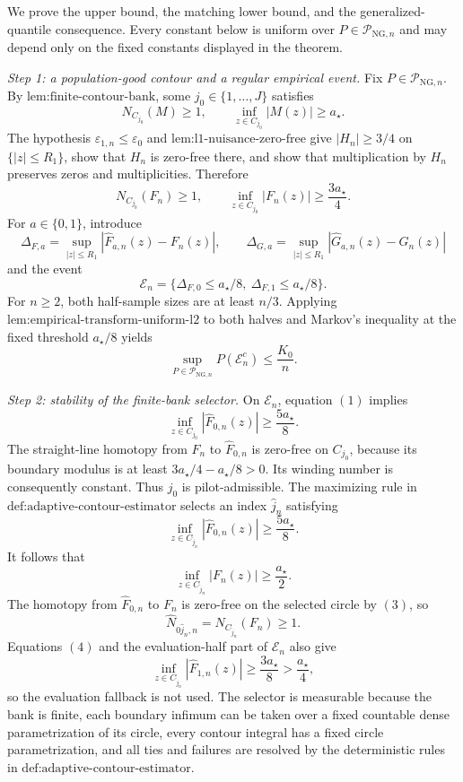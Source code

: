 We prove the upper bound, the matching lower bound, and the generalized-quantile consequence.  Every constant below is uniform over \(P\in\mathcal P_{\mathrm{NG},n}\) and may depend only on the fixed constants displayed in the theorem.

\emph{Step 1: a population-good contour and a regular empirical event.}
Fix \(P\in\mathcal P_{\mathrm{NG},n}\).  By \(\text{lem:finite-contour-bank}\), some \(j_0\in\{1,\ldots,J\}\) satisfies
\[
 N_{C_{j_0}}(M)\ge1,
 \qquad
 \inf_{z\in C_{j_0}}|M(z)|\ge a_{\star}.
\]
The hypothesis \(\varepsilon_{1,n}\le\varepsilon_0\) and \(\text{lem:l1-nuisance-zero-free}\) give \(|H_n|\ge3/4\) on \(\{|z|\le R_1\}\), show that \(H_n\) is zero-free there, and show that multiplication by \(H_n\) preserves zeros and multiplicities.  Therefore
\[
 N_{C_{j_0}}(F_n)\ge1,
 \qquad
 \inf_{z\in C_{j_0}}|F_n(z)|\ge\frac{3a_{\star}}4. \tag{1}
\]
For \(a\in\{0,1\}\), introduce
\[
 \Delta_{F,a}=\sup_{|z|\le R_1}
 |\widehat F_{a,n}(z)-F_n(z)|,
 \qquad
 \Delta_{G,a}=\sup_{|z|\le R_1}
 |\widehat G_{a,n}(z)-G_n(z)|
\]
and the event
\[
 \mathcal E_n=
 \{\Delta_{F,0}\le a_{\star}/8,\ 
   \Delta_{F,1}\le a_{\star}/8\}.
\]
For \(n\ge2\), both half-sample sizes are at least \(n/3\).  Applying \(\text{lem:empirical-transform-uniform-l2}\) to both halves and Markov's inequality at the fixed threshold \(a_{\star}/8\) yields
\[
 \sup_{P\in\mathcal P_{\mathrm{NG},n}}P(\mathcal E_n^c)
 \le \frac{K_0}{n}. \tag{2}
\]

\emph{Step 2: stability of the finite-bank selector.}
On \(\mathcal E_n\), equation \((1)\) implies
\[
 \inf_{z\in C_{j_0}}|\widehat F_{0,n}(z)|
 \ge\frac{5a_{\star}}8.
\]
The straight-line homotopy from \(F_n\) to \(\widehat F_{0,n}\) is zero-free on \(C_{j_0}\), because its boundary modulus is at least \(3a_{\star}/4-a_{\star}/8>0\).  Its winding number is consequently constant.  Thus \(j_0\) is pilot-admissible.  The maximizing rule in \(\text{def:adaptive-contour-estimator}\) selects an index \(\widehat j_n\) satisfying
\[
 \inf_{z\in C_{\widehat j_n}}|\widehat F_{0,n}(z)|
 \ge\frac{5a_{\star}}8. \tag{3}
\]
It follows that
\[
 \inf_{z\in C_{\widehat j_n}}|F_n(z)|
 \ge\frac{a_{\star}}2. \tag{4}
\]
The homotopy from \(\widehat F_{0,n}\) to \(F_n\) is zero-free on the selected circle by \((3)\), so
\[
 \widehat N_{0\widehat j_n,n}
 =N_{C_{\widehat j_n}}(F_n)\ge1. \tag{5}
\]
Equations \((4)\) and the evaluation-half part of \(\mathcal E_n\) also give
\[
 \inf_{z\in C_{\widehat j_n}}|\widehat F_{1,n}(z)|
 \ge\frac{3a_{\star}}8>\frac{a_{\star}}4, \tag{6}
\]
so the evaluation fallback is not used.  The selector is measurable because the bank is finite, each boundary infimum can be taken over a fixed countable dense parametrization of its circle, every contour integral has a fixed circle parametrization, and all ties and failures are resolved by the deterministic rules in \(\text{def:adaptive-contour-estimator}\).

